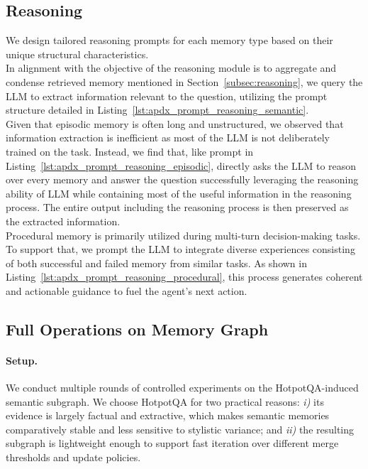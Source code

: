 {\subsection{Reasoning}

We design tailored reasoning prompts for each memory type based on their unique structural characteristics.\\
In alignment with the objective of the reasoning module is to aggregate and condense retrieved memory mentioned in Section~\ref{subsec:reasoning}, we query the LLM to extract information relevant to the question, utilizing the prompt structure detailed in Listing~\ref{lst:apdx_prompt_reasoning_semantic}.\\
Given that episodic memory is often long and unstructured, we observed that information extraction is inefficient as most of the LLM is not deliberately trained on the task. Instead, we find that, like prompt in Listing~\ref{lst:apdx_prompt_reasoning_episodic}, directly asks the LLM to reason over every memory and answer the question successfully leveraging the reasoning ability of LLM while containing most of the useful information in the reasoning process. The entire output including the reasoning process is then preserved as the extracted information.\\
Procedural memory is primarily utilized during multi-turn decision-making tasks. To support that, we prompt the LLM to integrate diverse experiences consisting of both successful and failed memory from similar tasks. As shown in Listing~\ref{lst:apdx_prompt_reasoning_procedural}, this process generates coherent and actionable guidance to fuel the agent's next action.

\label{app:implementation_reasoning}









\subsection{Full Operations on Memory Graph}

\label{app:full_operation}


\paragraph{Setup.} We conduct multiple rounds of controlled experiments on the HotpotQA-induced semantic subgraph. We choose HotpotQA for two practical reasons: \textit{i)} its evidence is largely factual and extractive, which makes semantic memories comparatively stable and less sensitive to stylistic variance; and \textit{ii)} the resulting subgraph is lightweight enough to support fast iteration over different merge thresholds and update policies.

}
